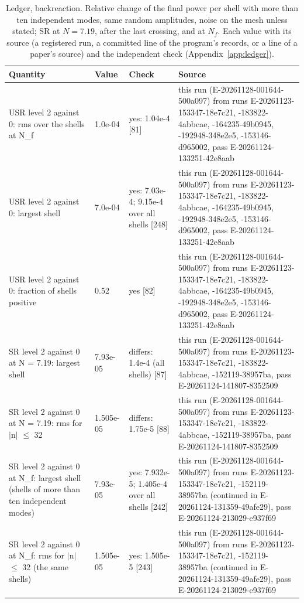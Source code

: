\begin{table}
\caption{Ledger, backreaction. Relative change of the final power per shell with more than ten independent modes, same random amplitudes, noise on the mesh unless stated; SR at $N = 7.19$, after the last crossing, and at $N_f$. Each value with its source (a registered run, a committed line of the program's records, or a line of a paper's source) and the independent check (Appendix~\ref{app:ledger}).}
\label{tab:ledgerbackreaction}
\footnotesize
\begin{tabular}{p{}p{}p{}p{}}
\toprule
Quantity & Value & Check & Source \\
\midrule
USR level 2 against 0: rms over the shells at N\_f & 1.0e-04 & yes: 1.04e-4 [81] & this run (E-20261128-001644-500a097) from runs E-20261123-153347-18e7c21, -183822-4abbcae, -164235-49b0945, -192948-348e2e5, -153146-d965002, pass E-20261124-133251-42e8aab \\
USR level 2 against 0: largest shell & 7.0e-04 & yes: 7.03e-4; 9.15e-4 over all shells [248] & this run (E-20261128-001644-500a097) from runs E-20261123-153347-18e7c21, -183822-4abbcae, -164235-49b0945, -192948-348e2e5, -153146-d965002, pass E-20261124-133251-42e8aab \\
USR level 2 against 0: fraction of shells positive & 0.52 & yes [82] & this run (E-20261128-001644-500a097) from runs E-20261123-153347-18e7c21, -183822-4abbcae, -164235-49b0945, -192948-348e2e5, -153146-d965002, pass E-20261124-133251-42e8aab \\
SR level 2 against 0 at N = 7.19: largest shell & 7.93e-05 & differs: 1.4e-4 (all shells) [87] & this run (E-20261128-001644-500a097) from runs E-20261123-153347-18e7c21, -183822-4abbcae, -152119-38957ba, pass E-20261124-141807-8352509 \\
SR level 2 against 0 at N = 7.19: rms for $|$n$|$ $\le$ 32 & 1.505e-05 & differs: 1.75e-5 [88] & this run (E-20261128-001644-500a097) from runs E-20261123-153347-18e7c21, -183822-4abbcae, -152119-38957ba, pass E-20261124-141807-8352509 \\
SR level 2 against 0 at N\_f: largest shell (shells of more than ten independent modes) & 7.93e-05 & yes: 7.932e-5; 1.405e-4 over all shells [242] & this run (E-20261128-001644-500a097) from runs E-20261123-153347-18e7c21, -152119-38957ba (continued in E-20261124-131359-49afe29), pass E-20261124-213029-e937f69 \\
SR level 2 against 0 at N\_f: rms for $|$n$|$ $\le$ 32 (the same shells) & 1.505e-05 & yes: 1.505e-5 [243] & this run (E-20261128-001644-500a097) from runs E-20261123-153347-18e7c21, -152119-38957ba (continued in E-20261124-131359-49afe29), pass E-20261124-213029-e937f69 \\

\end{tabular}
\end{table}
